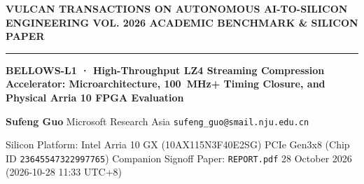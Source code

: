 \documentclass[11pt,a4paper]{article}
\begin{document}
{\scriptsize\sffamily\textcolor{vulcan}{\textbf{VULCAN TRANSACTIONS ON AUTONOMOUS AI-TO-SILICON ENGINEERING \hfill VOL. 2026 \textperiodcentered{} ACADEMIC BENCHMARK \& SILICON PAPER}}\par}

\vspace{1pt}\textcolor{vulcan}{\rule{\textwidth}{1.2pt}}\vspace{3pt}

\begin{center}

{\sffamily\LARGE\bfseries BELLOWS-L1 · High-Throughput LZ4 Streaming Compression Accelerator: Microarchitecture, 100~MHz+ Timing Closure, and Physical Arria 10 FPGA Evaluation\par}\vspace{3pt}

{\small\sffamily\textbf{Sufeng Guo} \textperiodcentered{} Microsoft Research Asia \textperiodcentered{} \texttt{sufeng\_guo@smail.nju.edu.cn}\par}\vspace{1pt}

{\scriptsize\sffamily\textcolor{black!75}{Silicon Platform: Intel Arria 10 GX (\allowbreak{}10AX115N3F40E2SG)\allowbreak{} PCIe Gen3x8 (Chip ID \texttt{23645547322997765}) \textperiodcentered{} Companion Signoff Paper: \texttt{REPORT.pdf} \textperiodcentered{} 28 October 2026 (\allowbreak{}2026-10-28 11:33 UTC+\allowbreak{}8)\allowbreak{}}\par}

\end{center}\vspace{2pt}
\end{document}
